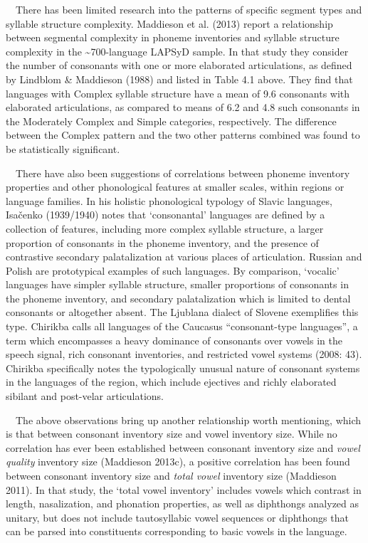 \documentclass[12pt]{article}
\newenvironment{styleBody}{\renewcommand\baselinestretch{1.0}\setlength\leftskip{0in}\setlength\rightskip{0in plus 1fil}\setlength\parindent{0in}\setlength\parfillskip{0pt plus 1fil}\setlength\parskip{0in plus 1pt}\writerlistparindent\writerlistleftskip\leavevmode\normalfont\normalsize\fontsize{11pt}{13.2pt}\selectfont\mdseries\upshape\writerlistlabel\ignorespaces}{\unskip\vspace{0in plus 1pt}\par}
\newcommand\writerlistleftskip{}
\newcommand\writerlistparindent{}
\newcommand\writerlistlabel{}
\begin{document}
\begin{styleBody}
\ \ There has been limited research into the patterns of specific segment types and syllable structure complexity. Maddieson et al. (2013) report a relationship between segmental complexity in phoneme inventories and syllable structure complexity in the \~{}700-language LAPSyD sample. In that study they consider the number of consonants with one or more elaborated articulations, as defined by Lindblom \& Maddieson (1988) and listed in Table 4.1 above. They find that languages with Complex syllable structure have a mean of 9.6 consonants with elaborated articulations, as compared to means of 6.2 and 4.8 such consonants in the Moderately Complex and Simple categories, respectively. The difference between the Complex pattern and the two other patterns combined was found to be statistically significant.
\end{styleBody}

\begin{styleBody}
\ \ There have also been suggestions of correlations between phoneme inventory properties and other phonological features at smaller scales, within regions or language families. In his holistic phonological typology of Slavic languages, Isačenko (1939/1940) notes that ‘consonantal’ languages are defined by a collection of features, including more complex syllable structure, a larger proportion of consonants in the phoneme inventory, and the presence of contrastive secondary palatalization at various places of articulation. Russian and Polish are prototypical examples of such languages. By comparison, ‘vocalic’ languages have simpler syllable structure, smaller proportions of consonants in the phoneme inventory, and secondary palatalization which is limited to dental consonants or altogether absent. The Ljublana dialect of Slovene exemplifies this type. Chirikba calls all languages of the Caucasus “consonant-type languages”, a term which encompasses a heavy dominance of consonants over vowels in the speech signal, rich consonant inventories, and restricted vowel systems (2008: 43). Chirikba specifically notes the typologically unusual nature of consonant systems in the languages of the region, which include ejectives and richly elaborated sibilant and post-velar articulations.
\end{styleBody}

\begin{styleBody}
\ \ The above observations bring up another relationship worth mentioning, which is that between consonant inventory size and vowel inventory size. While no correlation has ever been established between consonant inventory size and \textit{vowel quality} inventory size (Maddieson 2013c), a positive correlation has been found between consonant inventory size and \textit{total vowel} inventory size (Maddieson 2011). In that study, the ‘total vowel inventory’ includes vowels which contrast in length, nasalization, and phonation properties, as well as diphthongs analyzed as unitary, but does not include tautosyllabic vowel sequences or diphthongs that can be parsed into constituents corresponding to basic vowels in the language.
\end{styleBody}
\end{document}
